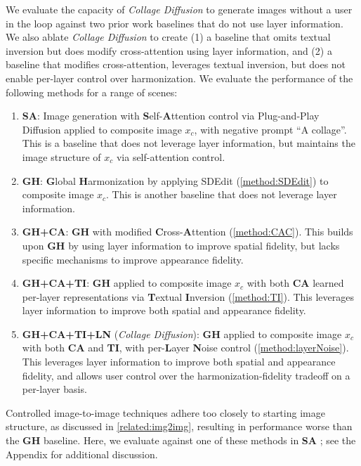 We evaluate the capacity of \textit{Collage Diffusion} to generate images without a user in the loop against two prior work baselines that do not use layer information. We also ablate \textit{Collage Diffusion} to create (1) a baseline that omits textual inversion but does modify cross-attention using layer information, and (2) a baseline that modifies cross-attention, leverages textual inversion, but does not enable per-layer control over harmonization.
We evaluate the performance of the following methods for a range of scenes: 
\begin{enumerate}%
    \item \textbf{SA}: Image generation with \textbf{S}elf-\textbf{A}ttention control via Plug-and-Play Diffusion \cite{tumanyan2022plug} applied to composite image $x_c$, with negative prompt ``A collage''. This is a baseline that does not leverage layer information, but maintains the image structure of $x_c$ via self-attention control.
    \item \textbf{GH}: \textbf{G}lobal \textbf{H}armonization by applying SDEdit \cite{sdedit} (\cref{method:SDEdit}) to composite image $x_c$. This is another baseline that does not leverage layer information. 
    \item \textbf{GH+CA}: \textbf{GH} with modified \textbf{C}ross-\textbf{A}ttention (\cref{method:CAC}). This builds upon \textbf{GH} by using layer information to improve spatial fidelity, but lacks specific mechanisms to improve appearance fidelity. 
    \item \textbf{GH+CA+TI}: \textbf{GH} applied to composite image $x_c$ with both \textbf{CA} learned per-layer representations via \textbf{T}extual \textbf{I}nversion \cite{TextualInversion} (\cref{method:TI}). This leverages layer information to improve both spatial and appearance fidelity.
    \item \textbf{GH+CA+TI+LN} (\textit{Collage Diffusion}): \textbf{GH} applied to composite image $x_c$ with both \textbf{CA} and \textbf{TI}, with per-\textbf{L}ayer \textbf{N}oise control (\cref{method:layerNoise}). This leverages layer information to improve both spatial and appearance fidelity, and allows user control over the harmonization-fidelity tradeoff on a per-layer basis.
\end{enumerate}
Controlled image-to-image techniques \cite{prompt2prompt,brooks2022instructpix2pix,tumanyan2022plug,mokady2022null} adhere too closely to starting image structure, as discussed in \cref{related:img2img}, resulting in performance worse than the \textbf{GH} baseline.
Here, we evaluate against one of these methods in \textbf{SA} \cite{tumanyan2022plug}; see the Appendix for additional discussion. 
\vspace{-0.5em}
